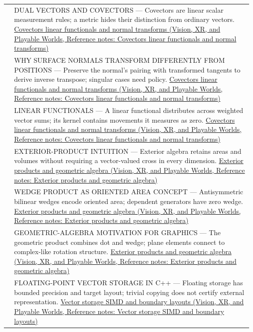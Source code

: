 {\begin{longtable}[]{@{}
  >{\raggedright\arraybackslash}p{}
  >{\raggedright\arraybackslash}p{}@{}}
581 & DUAL VECTORS AND COVECTORS --- Covectors are linear scalar measurement rules; a metric hides their distinction from ordinary vectors. \href{../07-Vision-XR-and-Playable-Worlds/main.pdf\#nameddest=appendix-46da295c6787}{Covectors linear functionals and normal transforms (Vision, XR, and Playable Worlds, Reference notes: Covectors linear functionals and normal transforms)} \\
582 & WHY SURFACE NORMALS TRANSFORM DIFFERENTLY FROM POSITIONS --- Preserve the normal's pairing with transformed tangents to derive inverse transpose; singular cases need policy. \href{../07-Vision-XR-and-Playable-Worlds/main.pdf\#nameddest=appendix-46da295c6787}{Covectors linear functionals and normal transforms (Vision, XR, and Playable Worlds, Reference notes: Covectors linear functionals and normal transforms)} \\
583 & LINEAR FUNCTIONALS --- A linear functional distributes across weighted vector sums; its kernel contains movements it measures as zero. \href{../07-Vision-XR-and-Playable-Worlds/main.pdf\#nameddest=appendix-46da295c6787}{Covectors linear functionals and normal transforms (Vision, XR, and Playable Worlds, Reference notes: Covectors linear functionals and normal transforms)} \\
584 & EXTERIOR-PRODUCT INTUITION --- Exterior algebra retains areas and volumes without requiring a vector-valued cross in every dimension. \href{../07-Vision-XR-and-Playable-Worlds/main.pdf\#nameddest=appendix-e1960925d1b8}{Exterior products and geometric algebra (Vision, XR, and Playable Worlds, Reference notes: Exterior products and geometric algebra)} \\
585 & WEDGE PRODUCT AS ORIENTED AREA CONCEPT --- Antisymmetric bilinear wedges encode oriented area; dependent generators have zero wedge. \href{../07-Vision-XR-and-Playable-Worlds/main.pdf\#nameddest=appendix-e1960925d1b8}{Exterior products and geometric algebra (Vision, XR, and Playable Worlds, Reference notes: Exterior products and geometric algebra)} \\
586 & GEOMETRIC-ALGEBRA MOTIVATION FOR GRAPHICS --- The geometric product combines dot and wedge; plane elements connect to complex-like rotation structure. \href{../07-Vision-XR-and-Playable-Worlds/main.pdf\#nameddest=appendix-e1960925d1b8}{Exterior products and geometric algebra (Vision, XR, and Playable Worlds, Reference notes: Exterior products and geometric algebra)} \\
587 & FLOATING-POINT VECTOR STORAGE IN C++ --- Floating storage has bounded precision and target layout; trivial copying does not certify external representation. \href{../07-Vision-XR-and-Playable-Worlds/main.pdf\#nameddest=appendix-26bf6bf2fb8b}{Vector storage SIMD and boundary layouts (Vision, XR, and Playable Worlds, Reference notes: Vector storage SIMD and boundary layouts)} \\

\end{longtable}}
